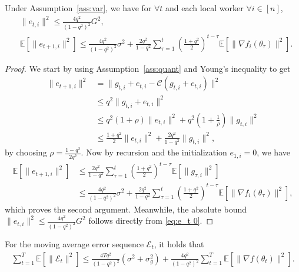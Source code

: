 \documentclass[11pt]{article}
\begin{document}
\begin{Lemma} \label{lemma:bound e_t}
Under Assumption~\ref{ass:var}, we have for $\forall t$ and each local worker $\forall i\in [n]$,
\begin{align*}
    &\|e_{t,i}\|^2\leq \frac{4q^2}{(1-q^2)^2}G^2,\\
    &\mathbb E[\|e_{t+1,i}\|^2]\leq \frac{4q^2}{(1-q^2)^2}\sigma^2 + \frac{2q^2}{1-q^2}\sum_{\tau=1}^t (\frac{1+q^2}{2})^{t-\tau} \mathbb E[\|\nabla f_i(\theta_\tau)\|^2].
\end{align*}
\end{Lemma}

\begin{proof}
We start by using Assumption~\ref{ass:quant} and Young's inequality to get
\begin{align}
    \|e_{t+1,i}\|^2&=\|g_{t,i}+e_{t,i}-\mathcal C(g_{t,i}+e_{t,i})\|^2 \nonumber\\
    &\leq q^2\|g_{t,i}+e_{t,i}\|^2 \nonumber\\
    &\leq q^2(1+\rho)\|e_{t,i}\|^2+q^2(1+\frac{1}{\rho})\|g_{t,i}\|^2 \nonumber\\
    &\leq \frac{1+q^2}{2}\|e_{t,i}\|^2 + \frac{2q^2}{1-q^2}\|g_{t,i}\|^2, \label{eq:e_t 0}
\end{align}
by choosing $\rho=\frac{1-q^2}{2q^2}$. Now by recursion and the initialization $e_{1,i}=0$, we have
\begin{align*}
    \mathbb E[\|e_{t+1,i}\|^2]&\leq \frac{2q^2}{1-q^2} \sum_{\tau=1}^t (\frac{1+q^2}{2})^{t-\tau} \mathbb E[\|g_{\tau,i}\|^2]  \\
    &\leq \frac{4q^2}{(1-q^2)^2}\sigma^2 + \frac{2q^2}{1-q^2}\sum_{\tau=1}^t (\frac{1+q^2}{2})^{t-\tau} \mathbb E[\|\nabla f_i(\theta_{\tau})\|^2], \nonumber
\end{align*}
which proves the second argument. Meanwhile, the absolute bound $\|e_{t,i}\|^2\leq \frac{4q^2}{(1-q^2)^2}G^2$ follows directly from \eqref{eq:e_t 0}.
\end{proof}

\begin{Lemma} \label{lemma:bound big E_t}
For the moving average error sequence $\mathcal E_t$, it holds that
\begin{align*}
    \sum_{t=1}^T \mathbb E[\|\mathcal E_t\|^2]\leq \frac{4Tq^2}{(1-q^2)^2}(\sigma^2+\sigma_g^2) + \frac{4q^2}{(1-q^2)^2} \sum_{t=1}^T \mathbb E[\|\nabla f(\theta_t)\|^2 ].
\end{align*}
\end{Lemma}
\end{document}
